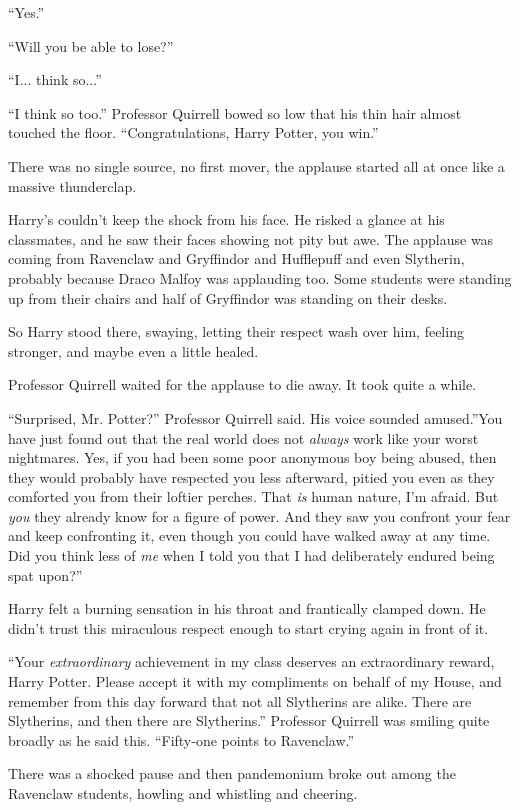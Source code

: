 ``Yes.''

``Will you be able to lose?''

``I... think so...''

``I think so too.'' Professor Quirrell bowed so low that his thin hair
almost touched the floor. ``Congratulations, Harry Potter, you win.''

There was no single source, no first mover, the applause started all at
once like a massive thunderclap.

Harry's couldn't keep the shock from his face. He risked a glance at his
classmates, and he saw their faces showing not pity but awe. The
applause was coming from Ravenclaw and Gryffindor and Hufflepuff and
even Slytherin, probably because Draco Malfoy was applauding too. Some
students were standing up from their chairs and half of Gryffindor was
standing on their desks.

So Harry stood there, swaying, letting their respect wash over him,
feeling stronger, and maybe even a little healed.

Professor Quirrell waited for the applause to die away. It took quite a
while.

``Surprised, Mr. Potter?'' Professor Quirrell said. His voice sounded
amused.''You have just found out that the real world does not
\emph{always} work like your worst nightmares. Yes, if you had been some
poor anonymous boy being abused, then they would probably have respected
you less afterward, pitied you even as they comforted you from their
loftier perches. That \emph{is} human nature, I'm afraid. But \emph{you}
they already know for a figure of power. And they saw you confront your
fear and keep confronting it, even though you could have walked away at
any time. Did you think less of \emph{me} when I told you that I had
deliberately endured being spat upon?''

Harry felt a burning sensation in his throat and frantically clamped
down. He didn't trust this miraculous respect enough to start crying
again in front of it.

``Your \emph{extraordinary} achievement in my class deserves an
extraordinary reward, Harry Potter. Please accept it with my compliments
on behalf of my House, and remember from this day forward that not all
Slytherins are alike. There are Slytherins, and then there are
Slytherins.'' Professor Quirrell was smiling quite broadly as he said
this. ``Fifty-one points to Ravenclaw.''

There was a shocked pause and then pandemonium broke out among the
Ravenclaw students, howling and whistling and cheering.

